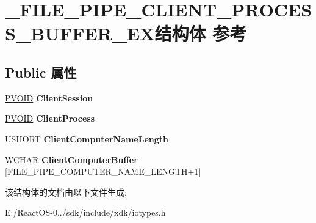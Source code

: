 \hypertarget{struct___f_i_l_e___p_i_p_e___c_l_i_e_n_t___p_r_o_c_e_s_s___b_u_f_f_e_r___e_x}{}\section{\+\_\+\+F\+I\+L\+E\+\_\+\+P\+I\+P\+E\+\_\+\+C\+L\+I\+E\+N\+T\+\_\+\+P\+R\+O\+C\+E\+S\+S\+\_\+\+B\+U\+F\+F\+E\+R\+\_\+\+E\+X结构体 参考}
\label{struct___f_i_l_e___p_i_p_e___c_l_i_e_n_t___p_r_o_c_e_s_s___b_u_f_f_e_r___e_x}
\subsection*{Public 属性}
\begin{DoxyCompactItemize}
\item 
\mbox{\label{struct___f_i_l_e___p_i_p_e___c_l_i_e_n_t___p_r_o_c_e_s_s___b_u_f_f_e_r___e_x_a56bfe2b0be1cf957fdad473b573722d5}} 
\hyperlink{interfacevoid}{P\+V\+O\+ID} {\bfseries Client\+Session}
\item 
\mbox{\label{struct___f_i_l_e___p_i_p_e___c_l_i_e_n_t___p_r_o_c_e_s_s___b_u_f_f_e_r___e_x_ad414a4a8397a379ba8e25c33de2efd13}} 
\hyperlink{interfacevoid}{P\+V\+O\+ID} {\bfseries Client\+Process}
\item 
\mbox{\label{struct___f_i_l_e___p_i_p_e___c_l_i_e_n_t___p_r_o_c_e_s_s___b_u_f_f_e_r___e_x_abe4e0629bfb4bc9c0a5305f693cddd2e}} 
U\+S\+H\+O\+RT {\bfseries Client\+Computer\+Name\+Length}
\item 
\mbox{\label{struct___f_i_l_e___p_i_p_e___c_l_i_e_n_t___p_r_o_c_e_s_s___b_u_f_f_e_r___e_x_a91e4e646988dc9fa715614ed2cc0b69c}} 
W\+C\+H\+AR {\bfseries Client\+Computer\+Buffer} \mbox{[}F\+I\+L\+E\+\_\+\+P\+I\+P\+E\+\_\+\+C\+O\+M\+P\+U\+T\+E\+R\+\_\+\+N\+A\+M\+E\+\_\+\+L\+E\+N\+G\+TH+1\mbox{]}
\end{DoxyCompactItemize}


该结构体的文档由以下文件生成\+:\begin{DoxyCompactItemize}
\item 
E\+:/\+React\+O\+S-\/0../sdk/include/xdk/iotypes.\+h\end{DoxyCompactItemize}
